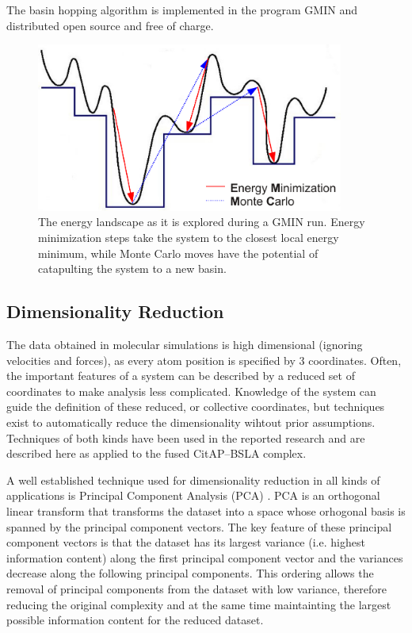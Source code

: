 \documentclass[english, a4paper, 12pt, titlepage, draft]{article}
\begin{document}
The basin hopping algorithm is implemented in the program GMIN \cite{GMIN} and distributed open source and free of charge.

\begin{figure}
    \centering
    \includegraphics[width=0.9\textwidth]{figures/GMIN.pdf}
    \caption{The energy landscape as it is explored during a GMIN run. Energy minimization steps take the system to the closest local energy minimum, while Monte Carlo moves have the potential of catapulting the system to a new basin.}
    \label{fig:GMIN}
\end{figure}        




\subsection{Dimensionality Reduction}

The data obtained in molecular simulations is high dimensional (ignoring velocities and forces), as every atom position is specified by 3 coordinates.
Often, the important features of a system can be described by a reduced set of coordinates to make analysis less complicated.
Knowledge of the system can guide the definition of these reduced, or collective coordinates, but techniques exist to automatically reduce the dimensionality wihtout prior assumptions.
Techniques of both kinds have been used in the reported research and are described here as applied to the fused CitAP--BSLA complex.

A well established technique used for dimensionality reduction in all kinds of applications is Principal Component Analysis (PCA) \cite{PCAoriginal} \cite{PCA}.
PCA is an orthogonal linear transform that transforms the dataset into a space whose orhogonal basis is spanned by the principal component vectors.
The key feature of these principal component vectors is that the dataset has its largest variance (i.e. highest information content) along the first principal component vector and the variances decrease along the following principal components.
This ordering allows the removal of principal components from the dataset with low variance, therefore reducing the original complexity and at the same time maintainting the largest possible information content for the reduced dataset.
\end{document}
